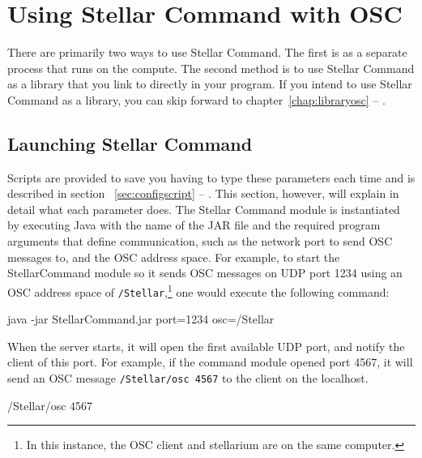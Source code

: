 \chapter{Using Stellar Command with OSC} \label{chap:launchosc}
There are primarily two ways to use Stellar Command. The first is as a separate process that runs on the compute. The second method is to use Stellar Command as a library that you link to directly in your program. If you intend to use Stellar Command as a library, you can skip forward to chapter~\ref{chap:libraryosc} --
\emph{}.


\section{Launching Stellar Command} \label{sec:launchcommand}
Scripts are provided to save you having to type these parameters each time and is described in section ~\ref{sec:configscript} --
\emph{}. This section, however, will explain in detail what each parameter does.
The Stellar Command module is instantiated by executing Java  with the name of the JAR file and the required program arguments that define communication, such as the network port to send OSC messages to, and the OSC address space.  
For example, to start the StellarCommand module so it sends OSC messages on UDP port 1234  using an OSC address space of \texttt{/Stellar},\footnote{In this instance, the OSC client and stellarium are on the same computer.} one would execute the following command:\\

\begin{syntax}  
\medskip
	java -jar StellarCommand.jar port=1234 osc=/Stellar  \\
\medskip
\end{syntax}
\bigskip
   When the server starts, it will open the first available UDP port, and notify the client of this port. For example, if the command module opened port 4567, it will send an OSC message \texttt{/Stellar/osc 4567} to the client on the localhost. 
   
\begin{syntax}
\medskip
	/Stellar/osc 4567  \\
\medskip
\end{syntax}
\bigskip

